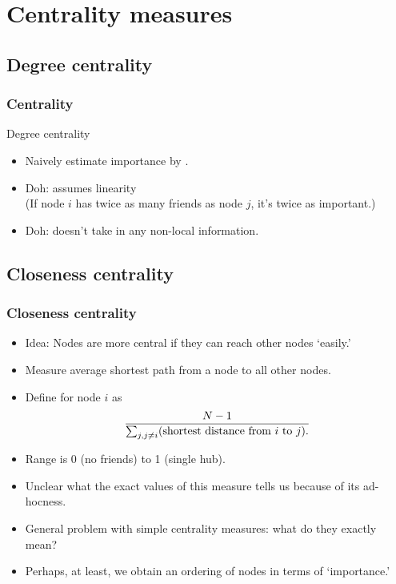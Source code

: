 \section{Centrality measures}

\subsection{Degree centrality}

\begin{frame}
  \frametitle{Centrality}

  \begin{block}{Degree centrality}
    \begin{itemize}
    \item<1->
      Naively estimate importance by .\cite{wasserman1994a}
    \item<2-> 
      \alert{Doh:} 
      assumes linearity\\
      (If node $i$ has twice as many friends as node $j$,
      it's twice as important.)
    \item<3-> 
      \alert{Doh:} 
      doesn't take in any non-local information.
    \end{itemize}
  \end{block}

\end{frame}

\subsection{Closeness centrality}

\begin{frame}
  \frametitle{Closeness centrality}

  \begin{itemize}
  \item<1->
    \alert{Idea:} 
    Nodes are more central if they
    can reach other nodes `easily.'
  \item<2->
    Measure average shortest path
    from a node to all other nodes.
  \item<3->
    Define  for node $i$ as
    $$
    \frac{N-1}
    {
      \sum_{j, j\ne i} (\textnormal{shortest distance from $i$ to $j$}).
    }
    $$
  \item<4->
    Range is 0 (no friends) to 1 (single hub).
  \item<5->
    Unclear what the exact values of this measure tells us because
    of its ad-hocness.
  \item<6->
    General problem with simple centrality measures:
    what do they exactly mean?
  \item<7->
    Perhaps, at least, we obtain an ordering
    of nodes in terms of `importance.'
  \end{itemize}

\end{frame}

